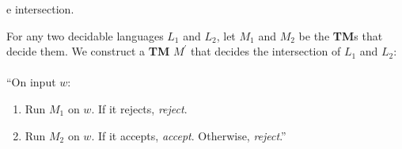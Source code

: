 \documentclass[11pt]{article}
\begin{document}
\begin{problem}[Part]{e}
intersection.
\end{problem}

For any two decidable languages $L_1$ and $L_2$, let $M_1$ and $M_2$ be the \textbf{TM}s that decide them. We construct a \textbf{TM} $M^{'}$ that decides the intersection of $L_1$ and $L_2$: \\
\\
\textquotedblleft On input $w$:
\begin{enumerate}
\item Run $M_1$ on $w$. If it rejects, \textit{reject}.
\item Run $M_2$ on $w$. If it accepts, \textit{accept}. Otherwise, \textit{reject}.\textquotedblright
\end{enumerate}
\end{document}
